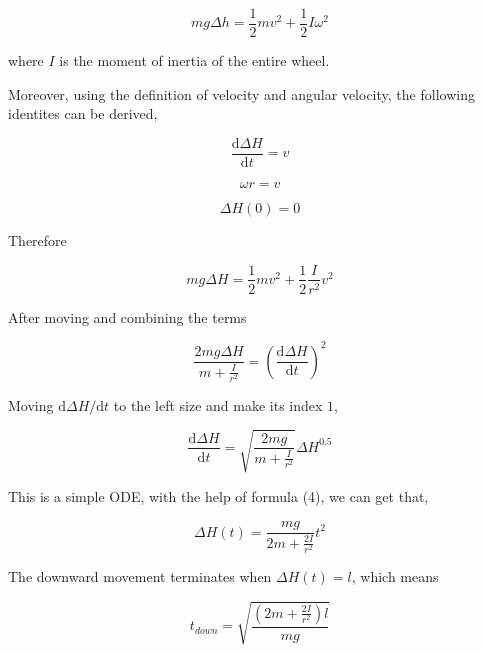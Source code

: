 \documentclass[a4paper]{article}
\begin{document}
\begin{equation}
    mg\Delta h = \frac{1}{2}m v^2 + \frac{1}{2} I \omega ^2
\end{equation}


where $I$ is the moment of inertia of the entire wheel. 

Moreover, using the definition of velocity and angular velocity, the following identites can be derived,

\begin{equation}
    \dfrac{\mathrm{d}\Delta H}{\mathrm{d}t} = v
\end{equation}

\begin{equation}
    \omega r = v
\end{equation}

\begin{equation}
    \Delta H(0) = 0
\end{equation}

Therefore

\begin{equation}
    mg\Delta H = \frac{1}{2}m v^2 + \frac{1}{2} \frac{I}{r^2} v ^2
\end{equation}

After moving and combining the terms

\begin{equation}
    \frac{2mg\Delta H}{m+\frac{I}{r^2}} = (\dfrac{\mathrm{d}\Delta H}{\mathrm{d}t})^2
\end{equation}

Moving ${\mathrm{d}\Delta H}/{\mathrm{d}t}$ to the left size and make its index $1$,

\begin{equation}
    \dfrac{\mathrm{d}\Delta H}{\mathrm{d}t} = \sqrt{\frac{2mg}{m+\frac{I}{r^2}}} \Delta H ^ {0.5}
\end{equation}

This is a simple ODE, with the help of formula (4), we can get that,

\begin{equation}
    \Delta H(t) = \dfrac{mg}{2m+\frac{2I}{r^2}} t^2
\end{equation}

The downward movement terminates when $\Delta H(t) = l$, which means 

\begin{equation}
    t_{down} = \sqrt{\dfrac{(2m+\frac{2I}{r^2})l}{mg}}
\end{equation}
\end{document}
